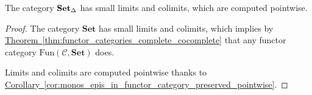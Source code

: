\documentclass[main.tex]{subfiles}
\begin{document}
\begin{proposition}
  \label{prop:sset_has_limits_colimits}
  The category $\operatorname{\mathbf{Set}_{\Delta}}$ has small limits and colimits, which are computed pointwise.
\end{proposition}
\begin{proof}
  The category $\mathbf{Set}$ has small limits and colimits, which implies by \hyperref[thm:functor_categories_complete_cocomplete]{Theorem~\ref*{thm:functor_categories_complete_cocomplete}} that any functor category $\mathrm{Fun}(\mathcal{C}, \mathbf{Set})$ does.

  Limits and colimits are computed pointwise thanks to \hyperref[cor:monos_epis_in_functor_category_preserved_pointwise]{Corollary~\ref*{cor:monos_epis_in_functor_category_preserved_pointwise}}.
\end{proof}
\end{document}
